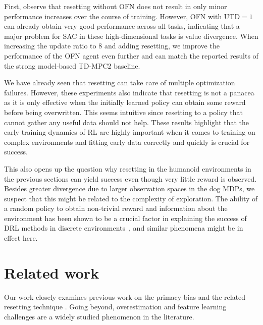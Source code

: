 First, observe that resetting without OFN does not result in only minor performance increases over the course of training. However, OFN with $\mathrm{UTD}=1$ can already obtain very good performance across all tasks, indicating that a major problem for SAC in these high-dimensional tasks is value divergence. When increasing the update ratio to $8$ and adding resetting, we improve the performance of the OFN agent even further and can match the reported results of the strong model-based TD-MPC2 baseline. 

We have already seen that resetting can take care of multiple optimization failures. However, these experiments also indicate that resetting is not a panacea as it is only effective when the initially learned policy can obtain some reward before being overwritten. 
This seems intuitive since resetting to a policy that cannot gather any useful data should not help. 
These results highlight that the early training dynamics of RL are highly important when it comes to training on complex environments and fitting early data correctly and quickly is crucial for success. 

This also opens up the question why resetting in the humanoid environments in the previous sections can yield success even though very little reward is observed. 
Besides greater divergence due to larger observation spaces in the dog MDPs, we suspect that this might be related to the complexity of exploration.
The ability of a random policy to obtain non-trivial reward and information about the environment has been shown to be a crucial factor in explaining the success of DRL methods in discrete environments~\parencite{laidlaw2023bridging}, and similar phenomena might be in effect here. 




\section{Related work}

Our work closely examines previous work on the primacy bias and the related resetting technique \parencite{anderson1992qlearning,nikishin2022primacy,doro2023barrier,schwarzer2023bigger}.
Going beyond, overestimation and feature learning challenges are a widely studied phenomenon in the literature.

